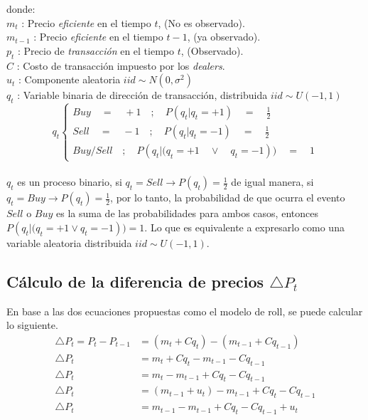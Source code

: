 \documentclass[a4paper]{article}
\begin{document}
donde: \\
${m}_{t}$ : Precio \textit{eficiente} en el tiempo $t$, (No es observado). \\
${m}_{t-1}$ : Precio \textit{eficiente} en el tiempo $t-1$, (ya observado). \\
${p}_{t}$ : Precio de \textit{transacci\'on} en el tiempo $t$, (Observado). \\
$C$ : Costo de transacci\'on impuesto por los \textit{dealers}. \\
${u}_{t}$ : Componente aleatoria $iid \sim N(0,{\sigma}^{2})$ \\
${q}_{t}$ : Variable binaria de direcci\'on de transacci\'on, distribuida $iid \sim U(-1, 1)$ \\

\begin{equation}\label{Condicion}
{ q }_{ t }\begin{cases} Buy\quad =\quad +1\quad ;\quad P({ q }_{ t }|{ q }_{ t }=+1)\quad =\quad \frac { 1 }{ 2 }  \\ Sell\quad =\quad -1\quad ;\quad P({ q }_{ t }|{ q }_{ t }=-1)\quad =\quad \frac { 1 }{ 2 }  \\ Buy/Sell\quad ;\quad P({ q }_{ t }|{ (q }_{ t }=+1\quad \vee \quad { q }_{ t }=-1))\quad =\quad 1 \end{cases}
\end{equation}
\\

${q}_{t}$ es un proceso binario, si ${q}_{t} = Sell \rightarrow P({q}_{t}) = \frac{1}{2}$ de igual manera, si ${q}_{t} = Buy \rightarrow P({q}_{t}) = \frac{1}{2}$, por lo tanto, la probabilidad de que ocurra el evento $Sell$ o $Buy$ es la suma de las probabilidades para ambos casos, entonces $P({ q }_{ t }|{ (q }_{ t }=+1 \vee  { q }_{ t }=-1)) = 1$. Lo que es equivalente a expresarlo como una variable aleatoria distribuida $iid \sim U(-1, 1)$.

\subsection*{C\'alculo de la diferencia de precios $\triangle{P}_{t}$ }

En base a las dos ecuaciones propuestas como el modelo de roll, se puede calcular lo siguiente.\\

\begin{equation*}
\begin{aligned}
	\triangle{P}_{t} = {P}_{t} - {P}_{t-1} &= ({m}_{t} + C {q}_{t}) - ({m}_{t-1} + C {q}_{t-1}) \\
	 \triangle{P}_{t} &= {m}_{t} + C{q}_{t} - {m}_{t-1} - C {q}_{t-1} \\
     \triangle{P}_{t} &= {m}_{t} - {m}_{t-1} + C{q}_{t} - C{q}_{t-1} \\
     \triangle{P}_{t} &= ({m}_{t-1} + {u}_{t}) - {m}_{t-1} + C{q}_{t} - C{q}_{t-1} \\
     \triangle{P}_{t} &= {m}_{t-1} - {m}_{t-1} + C{q}_{t} - C{q}_{t-1} + {u}_{t} \\ \\
\end{aligned}
\end{equation*}
\end{document}
